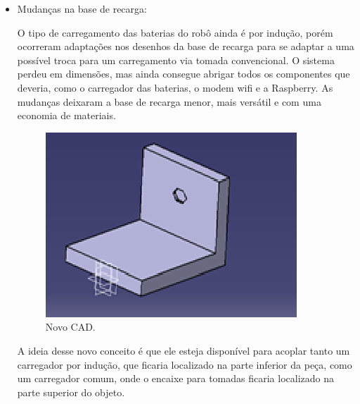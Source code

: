 \begin{itemize}
      \item Mudanças na base de recarga:

      	O tipo de carregamento das baterias do robô ainda é por indução, porém ocorreram adaptações nos desenhos da base de recarga para se adaptar a uma possível troca para um carregamento via tomada convencional. O sistema perdeu em dimensões, mas ainda consegue abrigar todos os componentes que deveria, como o carregador das baterias, o modem wifi e a Raspberry. As mudanças deixaram a base de recarga menor, mais versátil e com uma economia de materiais.

      	\begin{figure}[H]
            \centering
            \includegraphics[scale=0.8]{figuras/novocad.png}
            \caption{Novo CAD.}
            \label{img:novo_cad}
         \end{figure}

        A ideia desse novo conceito é que ele esteja disponível para acoplar tanto um carregador por indução, que ficaria localizado na parte inferior da peça, como um carregador comum, onde o encaixe para tomadas ficaria localizado na parte superior do objeto.


\end{itemize}
